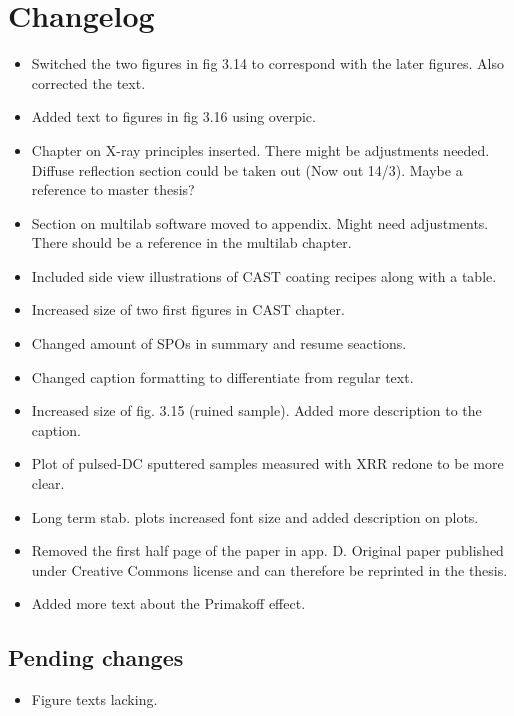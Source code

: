 \chapter{Changelog}

\begin{itemize}
  \item Switched the two figures in fig 3.14 to correspond with the later figures. Also corrected the text.
  \item Added text to figures in fig 3.16 using overpic.
  \item Chapter on X-ray principles inserted. There might be adjustments needed. Diffuse reflection section could be taken out (Now out 14/3). Maybe a reference to master thesis?
  \item Section on multilab software moved to appendix. Might need adjustments. There should be a reference in the multilab chapter.
  \item Included side view illustrations of CAST coating recipes along with a table.
  \item Increased size of two first figures in CAST chapter.
  \item Changed amount of SPOs in summary and resume seactions.
  \item Changed caption formatting to differentiate from regular text.
  \item Increased size of fig. 3.15 (ruined sample). Added more description to the caption.
  \item Plot of pulsed-DC sputtered samples measured with XRR redone to be more clear.
  \item Long term stab. plots increased font size and added description on plots.
  \item Removed the first half page of the paper in app. D. Original paper published under Creative Commons license and can therefore be reprinted in the thesis.
  \item Added more text about the Primakoff effect.
\end{itemize}

\section{Pending changes}
\begin{itemize}
\item Figure texts lacking.
\end{itemize}
